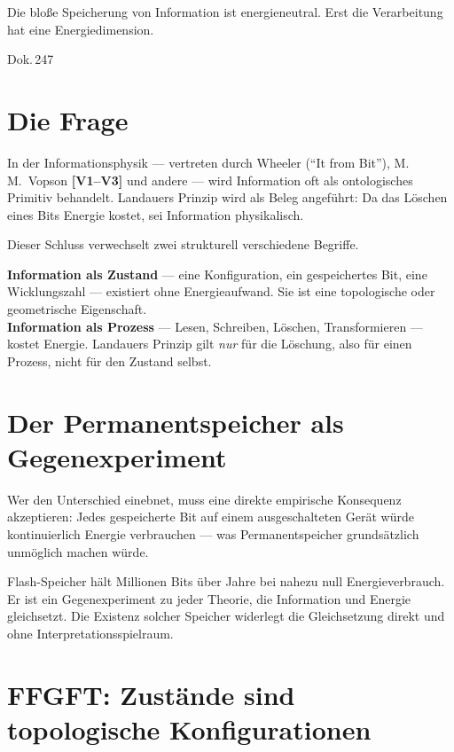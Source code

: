 \label{ch:zustand_prozess}

\epigraph{Die bloße Speicherung von Information ist energieneutral.
Erst die Verarbeitung hat eine Energiedimension.}{Dok.\,247}

\section{Die Frage}

In der Informationsphysik --- vertreten durch Wheeler (\enquote{It from Bit}),
M.\,M.~Vopson \textbf{[V1--V3]} und andere --- wird Information oft als ontologisches
Primitiv behandelt. Landauers Prinzip wird als Beleg angeführt: Da das
Löschen eines Bits Energie kostet, sei Information physikalisch.

Dieser Schluss verwechselt zwei strukturell verschiedene Begriffe.

\begin{keyresult}
\textbf{Information als Zustand} --- eine Konfiguration, ein gespeichertes
Bit, eine Wicklungszahl --- existiert ohne Energieaufwand. Sie ist eine
topologische oder geometrische Eigenschaft.\\[4pt]
\textbf{Information als Prozess} --- Lesen, Schreiben, Löschen, Transformieren
--- kostet Energie. Landauers Prinzip gilt \emph{nur} für die Löschung,
also für einen Prozess, nicht für den Zustand selbst.
\end{keyresult}

\section{Der Permanentspeicher als Gegenexperiment}

Wer den Unterschied einebnet, muss eine direkte empirische Konsequenz
akzeptieren: Jedes gespeicherte Bit auf einem ausgeschalteten Gerät würde
kontinuierlich Energie verbrauchen --- was Permanentspeicher grundsätzlich
unmöglich machen würde.

Flash-Speicher hält Millionen Bits über Jahre bei nahezu null Energieverbrauch.
Er ist ein Gegenexperiment zu jeder Theorie, die Information und Energie
gleichsetzt. Die Existenz solcher Speicher widerlegt die Gleichsetzung direkt
und ohne Interpretationsspielraum.

\section{FFGFT: Zustände sind topologische Konfigurationen}

